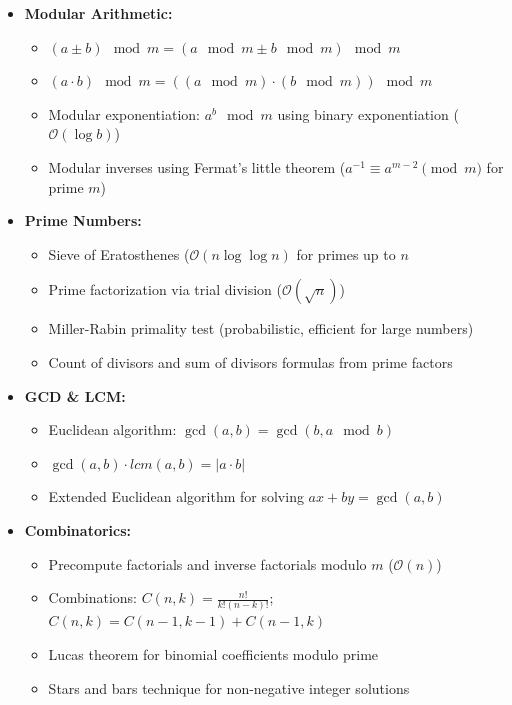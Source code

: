 \documentclass[a4paper,10pt]{book}
\begin{document}
\begin{itemize}
    \item \textbf{Modular Arithmetic:}
    \begin{itemize}
        \item $(a \pm b) \mod m = (a \mod m \pm b \mod m) \mod m$
        \item $(a \cdot b) \mod m = ((a \mod m) \cdot (b \mod m)) \mod m$
        \item Modular exponentiation: $a^b \mod m$ using binary exponentiation ($\mathcal{O}(\log b)$)
        \item Modular inverses using Fermat's little theorem ($a^{-1} \equiv a^{m-2} \pmod{m}$ for prime $m$)
    \end{itemize}
    
    \item \textbf{Prime Numbers:}
    \begin{itemize}
        \item Sieve of Eratosthenes ($\mathcal{O}(n \log \log n)$ for primes up to $n$
        \item Prime factorization via trial division ($\mathcal{O}(\sqrt{n})$)
        \item Miller-Rabin primality test (probabilistic, efficient for large numbers)
        \item Count of divisors and sum of divisors formulas from prime factors
    \end{itemize}
    
    \item \textbf{GCD \& LCM:}
    \begin{itemize}
        \item Euclidean algorithm: $\gcd(a,b) = \gcd(b, a \mod b)$
        \item $\gcd(a,b) \cdot lcm(a,b) = |a \cdot b|$
        \item Extended Euclidean algorithm for solving $ax + by = \gcd(a,b)$
    \end{itemize}
    
    \item \textbf{Combinatorics:}
    \begin{itemize}
        \item Precompute factorials and inverse factorials modulo $m$ ($\mathcal{O}(n)$)
        \item Combinations: $C(n,k) = \frac{n!}{k!(n-k)!}$; $C(n,k) = C(n-1,k-1) + C(n-1,k)$
        \item Lucas theorem for binomial coefficients modulo prime
        \item Stars and bars technique for non-negative integer solutions
    \end{itemize}
    

\end{itemize}
\end{document}
